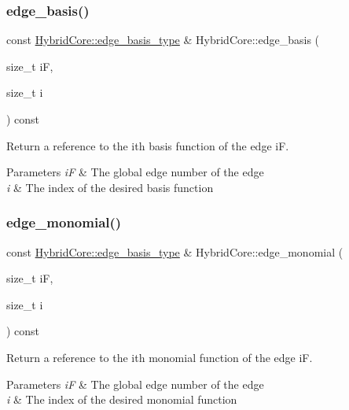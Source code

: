 \subsubsection{\texorpdfstring{edge\+\_\+basis()}{edge\_basis()}}
{\footnotesize\ttfamily const \hyperlink{classHArDCore2D_1_1HybridCore_a9e3231c1356e797daaa3476ff1fa4154}{Hybrid\+Core\+::edge\+\_\+basis\+\_\+type} \& Hybrid\+Core\+::edge\+\_\+basis (\begin{DoxyParamCaption}\item[{size\+\_\+t}]{iF,  }\item[{size\+\_\+t}]{i }\end{DoxyParamCaption}) const}



Return a reference to the i\textquotesingle{}th basis function of the edge iF. 


\begin{DoxyParams}{Parameters}
{\em iF} & The global edge number of the edge \\
\hline
{\em i} & The index of the desired basis function \\
\hline
\end{DoxyParams}
\mbox{\label{classHArDCore2D_1_1HybridCore_a9a0879fca63fe056f75bb0574584639b}} 
\subsubsection{\texorpdfstring{edge\+\_\+monomial()}{edge\_monomial()}}
{\footnotesize\ttfamily const \hyperlink{classHArDCore2D_1_1HybridCore_a9e3231c1356e797daaa3476ff1fa4154}{Hybrid\+Core\+::edge\+\_\+basis\+\_\+type} \& Hybrid\+Core\+::edge\+\_\+monomial (\begin{DoxyParamCaption}\item[{size\+\_\+t}]{iF,  }\item[{size\+\_\+t}]{i }\end{DoxyParamCaption}) const}



Return a reference to the i\textquotesingle{}th monomial function of the edge iF. 


\begin{DoxyParams}{Parameters}
{\em iF} & The global edge number of the edge \\
\hline
{\em i} & The index of the desired monomial function \\
\hline
\end{DoxyParams}
\mbox{\label{classHArDCore2D_1_1HybridCore_a4158e234143fd956fd4038adf9097bc2}} 
